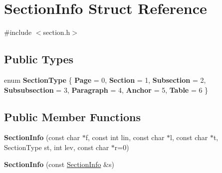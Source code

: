\hypertarget{struct_section_info}{}\section{Section\+Info Struct Reference}
\label{struct_section_info}


{\ttfamily \#include $<$section.\+h$>$}

\subsection*{Public Types}
\begin{DoxyCompactItemize}
\item 
\mbox{\label{struct_section_info_a32308f52dd59422b14fb75a92c90ebf1}} 
enum {\bfseries Section\+Type} \{ \newline
{\bfseries Page} = 0, 
{\bfseries Section} = 1, 
{\bfseries Subsection} = 2, 
{\bfseries Subsubsection} = 3, 
\newline
{\bfseries Paragraph} = 4, 
{\bfseries Anchor} = 5, 
{\bfseries Table} = 6
 \}
\end{DoxyCompactItemize}
\subsection*{Public Member Functions}
\begin{DoxyCompactItemize}
\item 
\mbox{\label{struct_section_info_a32f7bf6d4f16717331867621b5753fe1}} 
{\bfseries Section\+Info} (const char $\ast$f, const int lin, const char $\ast$l, const char $\ast$t, Section\+Type st, int lev, const char $\ast$r=0)
\item 
\mbox{\label{struct_section_info_acd07dd13cd3d649a7a103e91d5c59cd9}} 
{\bfseries Section\+Info} (const \mbox{\hyperlink{struct_section_info}{Section\+Info}} \&s)
\end{DoxyCompactItemize}
